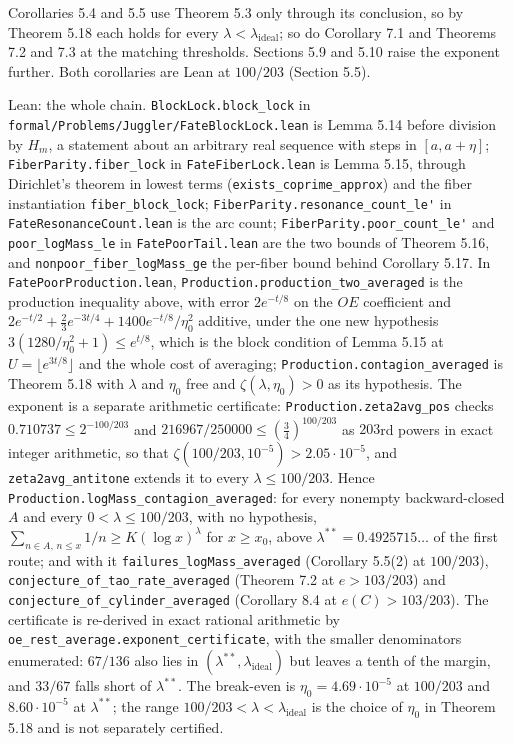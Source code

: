 \documentclass[11pt,a4paper]{article}
\begin{document}
Corollaries 5.4 and 5.5 use Theorem 5.3 only through its conclusion, so
by Theorem 5.18 each holds for every
\(\lambda<\lambda_{\mathrm{ideal}}\); so do Corollary 7.1 and Theorems
7.2 and 7.3 at the matching thresholds. Sections 5.9 and 5.10 raise the
exponent further. Both corollaries are Lean at \(100/203\) (Section
5.5).

Lean: the whole chain. \texttt{\nolinkurl{BlockLock.block_lock}} in
\texttt{\nolinkurl{formal/Problems/Juggler/FateBlockLock.lean}} is Lemma
5.14 before division by \(H_m\), a statement about an arbitrary real
sequence with steps in \([a,a+\eta]\);
\texttt{\nolinkurl{FiberParity.fiber_lock}} in
\texttt{\nolinkurl{FateFiberLock.lean}} is Lemma 5.15, through
Dirichlet's theorem in lowest terms
(\texttt{\nolinkurl{exists_coprime_approx}}) and the fiber instantiation
\texttt{\nolinkurl{fiber_block_lock}};
\texttt{\nolinkurl{FiberParity.resonance_count_le'}} in
\texttt{\nolinkurl{FateResonanceCount.lean}} is the arc count;
\texttt{\nolinkurl{FiberParity.poor_count_le'}} and
\texttt{\nolinkurl{poor_logMass_le}} in
\texttt{\nolinkurl{FatePoorTail.lean}} are the two bounds of Theorem
5.16, and \texttt{\nolinkurl{nonpoor_fiber_logMass_ge}} the per-fiber
bound behind Corollary 5.17. In
\texttt{\nolinkurl{FatePoorProduction.lean}},
\texttt{\nolinkurl{Production.production_two_averaged}} is the
production inequality above, with error \(2e^{-t/8}\) on the \(OE\)
coefficient and \(2e^{-t/2}+\tfrac23e^{-3t/4}+1400e^{-t/8}/\eta_0^2\)
additive, under the one new hypothesis
\(3(1280/\eta_0^2+1)\le e^{t/8}\), which is the block condition of Lemma
5.15 at \(U=\lfloor e^{3t/8}\rfloor\) and the whole cost of averaging;
\texttt{\nolinkurl{Production.contagion_averaged}} is Theorem 5.18 with
\(\lambda\) and \(\eta_0\) free and \(\zeta(\lambda,\eta_0)>0\) as its
hypothesis. The exponent is a separate arithmetic certificate:
\texttt{\nolinkurl{Production.zeta2avg_pos}} checks
\(0.710737\le2^{-100/203}\) and \(216967/250000\le(\tfrac34)^{100/203}\)
as \(203\)rd powers in exact integer arithmetic, so that
\(\zeta(100/203,10^{-5})>2.05\cdot10^{-5}\), and
\texttt{\nolinkurl{zeta2avg_antitone}} extends it to every
\(\lambda\le100/203\). Hence
\texttt{\nolinkurl{Production.logMass_contagion_averaged}}: for every
nonempty backward-closed \(A\) and every \(0<\lambda\le100/203\), with
no hypothesis, \(\sum_{n\in A,\,n\le x}1/n\ge K(\log x)^\lambda\) for
\(x\ge x_0\), above \(\lambda^{**}=0.4925715\ldots\) of the first route;
and with it \texttt{\nolinkurl{failures_logMass_averaged}} (Corollary
5.5(2) at \(100/203\)),
\texttt{\nolinkurl{conjecture_of_tao_rate_averaged}} (Theorem 7.2 at
\(e>103/203\)) and \texttt{\nolinkurl{conjecture_of_cylinder_averaged}}
(Corollary 8.4 at \(e(C)>103/203\)). The certificate is re-derived in
exact rational arithmetic by
\texttt{\nolinkurl{oe_rest_average.exponent_certificate}}, with the
smaller denominators enumerated: \(67/136\) also lies in
\((\lambda^{**},\lambda_{\mathrm{ideal}})\) but leaves a tenth of the
margin, and \(33/67\) falls short of \(\lambda^{**}\). The break-even is
\(\eta_0=4.69\cdot10^{-5}\) at \(100/203\) and \(8.60\cdot10^{-5}\) at
\(\lambda^{**}\); the range \(100/203<\lambda<\lambda_{\mathrm{ideal}}\)
is the choice of \(\eta_0\) in Theorem 5.18 and is not separately
certified.
\end{document}
